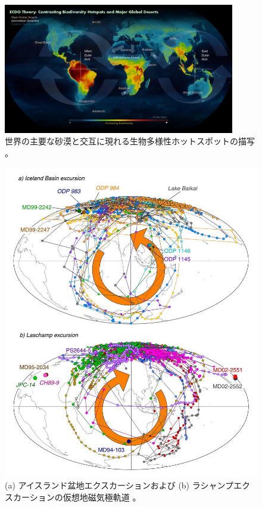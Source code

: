 \documentclass[10pt,twocolumn,letterpaper]{article}
\begin{document}
\begin{figure}[t]
\begin{center}
\includegraphics[width=0.9\textwidth]{biodiversity.jpg}
\end{center}
   \caption{世界の主要な砂漠と交互に現れる生物多様性ホットスポットの描写 \cite{28}。}
\label{fig:9}
\end{figure}

\begin{figure}[t]
\begin{center}
   \includegraphics[width=0.95\linewidth]{laj.jpg}
\end{center}
   \caption{(a) アイスランド盆地エクスカーションおよび (b) ラシャンプエクスカーションの仮想地磁気極軌道 \cite{35}。}
\label{fig:7}
\label{fig:onecol}
\end{figure}
\end{document}

